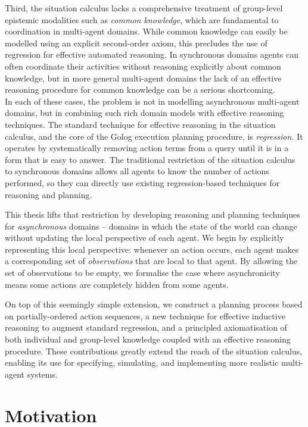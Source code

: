 Third, the situation calculus lacks a comprehensive treatment of group-level
epistemic modalities such as \emph{common knowledge}, which are fundamental
to coordination in multi-agent domains. While common knowledge can
easily be modelled using an explicit second-order axiom, this precludes
the use of regression for effective automated reasoning. In synchronous
domains agents can often coordinate their activities without reasoning
explicitly about common knowledge, but in more general multi-agent
domains the lack of an effective reasoning procedure for common knowledge
can be a serious shortcoming.\\


In each of these cases, the problem is not in modelling asynchronous
multi-agent domains, but in combining such rich domain models with
effective reasoning techniques. The standard technique for effective
reasoning in the situation calculus, and the core of the Golog execution
planning procedure, is \emph{regression.} It operates by systematically
removing action terms from a query until it is in a form that is easy
to answer. The traditional restriction of the situation calculus to
synchronous domains allows all agents to know the number of actions
performed, so they can directly use existing regression-based techniques
for reasoning and planning.

This thesis lifts that restriction by developing reasoning and planning
techniques for \emph{asynchronous} domains -- domains in which the
state of the world can change without updating the local perspective
of each agent. We begin by explicitly representing this local perspective:
whenever an action occurs, each agent makes a corresponding set of
\emph{observations} that are local to that agent. By allowing the
set of observations to be empty, we formalise the case where asynchronicity
means some actions are completely hidden from some agents.

On top of this seemingly simple extension, we construct a planning
process based on partially-ordered action sequences, a new technique
for effective inductive reasoning to augment standard regression,
and a principled axiomatisation of both individual and group-level
knowledge coupled with an effective reasoning procedure. These contributions
greatly extend the reach of the situation calculus, enabling its use
for specifying, simulating, and implementing more realistic multi-agent
systems.


\section{Motivation}

